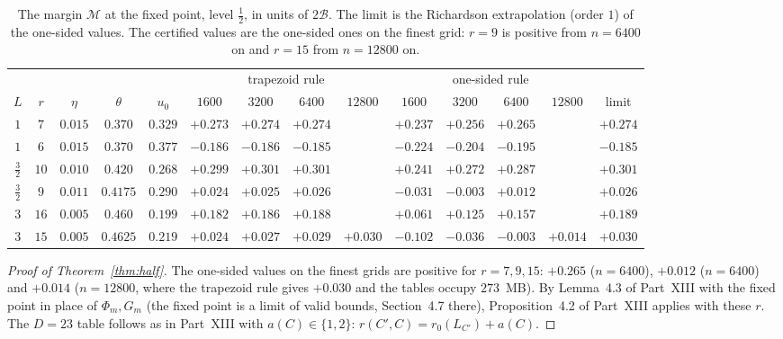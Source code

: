 \documentclass[11pt]{amsart}
\theoremstyle{remark}
\newcommand{\cM}{\mathcal M}
\begin{document}
\begin{table}[htbp]
\centering\footnotesize\setlength{\tabcolsep}{3.5pt}
\begin{tabular}{ccccc|cccc|cccc|c}
\toprule
& & & & & \multicolumn{4}{c|}{trapezoid rule} & \multicolumn{4}{c|}{one-sided rule} & \\
$L$ & $r$ & $\eta$ & $\theta$ & $u_0$ & $1600$ & $3200$ & $6400$ & $12800$ & $1600$ & $3200$ & $6400$ & $12800$ & limit\\
\midrule
$1$ & $7$ & $0.015$ & $0.370$ & $0.329$ & $+0.273$ & $+0.274$ & $+0.274$ & & $+0.237$ & $+0.256$ & $+0.265$ & & $+0.274$\\
$1$ & $6$ & $0.015$ & $0.370$ & $0.377$ & $-0.186$ & $-0.186$ & $-0.185$ & & $-0.224$ & $-0.204$ & $-0.195$ & & $-0.185$\\
$\frac32$ & $10$ & $0.010$ & $0.420$ & $0.268$ & $+0.299$ & $+0.301$ & $+0.301$ & & $+0.241$ & $+0.272$ & $+0.287$ & & $+0.301$\\
$\frac32$ & $9$ & $0.011$ & $0.4175$ & $0.290$ & $+0.024$ & $+0.025$ & $+0.026$ & & $-0.031$ & $-0.003$ & $+0.012$ & & $+0.026$\\
$3$ & $16$ & $0.005$ & $0.460$ & $0.199$ & $+0.182$ & $+0.186$ & $+0.188$ & & $+0.061$ & $+0.125$ & $+0.157$ & & $+0.189$\\
$3$ & $15$ & $0.005$ & $0.4625$ & $0.219$ & $+0.024$ & $+0.027$ & $+0.029$ & $+0.030$ & $-0.102$ & $-0.036$ & $-0.003$ & $+0.014$ & $+0.030$\\
\bottomrule
\end{tabular}
\caption{The margin $\cM$ at the fixed point, level $\frac12$, in units of $2\mathcal B$. The limit is the Richardson extrapolation (order $1$) of the one-sided values. The certified values are the one-sided ones on the finest grid: $r=9$ is positive from $n=6400$ on and $r=15$ from $n=12800$ on.}
\label{tab:half}
\end{table}

\begin{proof}[Proof of Theorem~\ref{thm:half}]
The one-sided values on the finest grids are positive for $r=7,9,15$: $+0.265$ ($n=6400$), $+0.012$ ($n=6400$) and $+0.014$ ($n=12800$, where the trapezoid rule gives $+0.030$ and the tables occupy $273$~MB). By Lemma~4.3 of Part~XIII with the fixed point in place of $\Phi_m,G_m$ (the fixed point is a limit of valid bounds, Section~4.7 there), Proposition~4.2 of Part~XIII applies with these $r$. The $D=23$ table follows as in Part~XIII with $a(C)\in\{1,2\}$: $r(C',C)=r_0(L_{C'})+a(C)$.
\end{proof}
\end{document}
